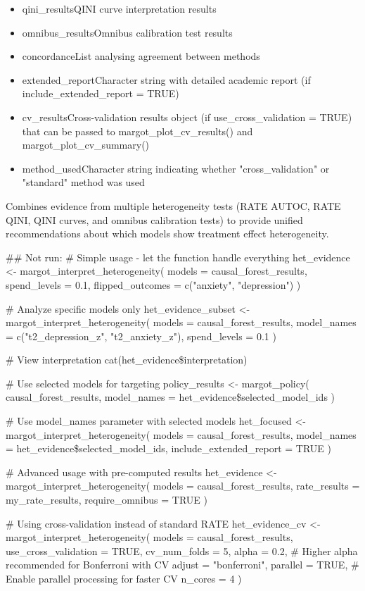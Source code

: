 \documentclass[a4paper]{book}
\begin{document}
\begin{Arguments}
\begin{itemize}
\item{} qini\_resultsQINI curve interpretation results
\item{} omnibus\_resultsOmnibus calibration test results
\item{} concordanceList analysing agreement between methods
\item{} extended\_reportCharacter string with detailed academic report (if include\_extended\_report = TRUE)
\item{} cv\_resultsCross-validation results object (if use\_cross\_validation = TRUE) that can be passed to margot\_plot\_cv\_results() and margot\_plot\_cv\_summary()
\item{} method\_usedCharacter string indicating whether "cross\_validation" or "standard" method was used

\end{itemize}



Combines evidence from multiple heterogeneity tests (RATE AUTOC, RATE QINI, 
QINI curves, and omnibus calibration tests) to provide unified recommendations 
about which models show treatment effect heterogeneity.


## Not run: 
\# Simple usage - let the function handle everything
het\_evidence <- margot\_interpret\_heterogeneity(
  models = causal\_forest\_results,
  spend\_levels = 0.1,
  flipped\_outcomes = c("anxiety", "depression")
)

\# Analyze specific models only
het\_evidence\_subset <- margot\_interpret\_heterogeneity(
  models = causal\_forest\_results,
  model\_names = c("t2\_depression\_z", "t2\_anxiety\_z"),
  spend\_levels = 0.1
)

\# View interpretation
cat(het\_evidence\$interpretation)

\# Use selected models for targeting
policy\_results <- margot\_policy(
  causal\_forest\_results,
  model\_names = het\_evidence\$selected\_model\_ids
)

\# Use model\_names parameter with selected models
het\_focused <- margot\_interpret\_heterogeneity(
  models = causal\_forest\_results,
  model\_names = het\_evidence\$selected\_model\_ids,
  include\_extended\_report = TRUE
)

\# Advanced usage with pre-computed results
het\_evidence <- margot\_interpret\_heterogeneity(
  models = causal\_forest\_results,
  rate\_results = my\_rate\_results,
  require\_omnibus = TRUE
)

\# Using cross-validation instead of standard RATE
het\_evidence\_cv <- margot\_interpret\_heterogeneity(
  models = causal\_forest\_results,
  use\_cross\_validation = TRUE,
  cv\_num\_folds = 5,
  alpha = 0.2,  \# Higher alpha recommended for Bonferroni with CV
  adjust = "bonferroni",
  parallel = TRUE,  \# Enable parallel processing for faster CV
  n\_cores = 4
)


\end{Arguments}
\end{document}
